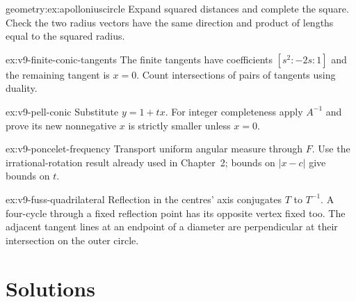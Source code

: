 \begin{hint}{geometry:ex:apolloniuscircle}
Expand squared distances and complete the square. Check the two radius vectors have the same direction and product of lengths equal to the squared radius.
\end{hint}
\begin{hint}{ex:v9-finite-conic-tangents}
The finite tangents have coefficients $[s^2:-2s:1]$ and the remaining tangent is $x=0$. Count intersections of pairs of tangents using duality.
\end{hint}
\begin{hint}{ex:v9-pell-conic}
Substitute $y=1+tx$. For integer completeness apply $A^{-1}$ and prove its new nonnegative $x$ is strictly smaller unless $x=0$.
\end{hint}
\begin{hint}{ex:v9-poncelet-frequency}
Transport uniform angular measure through $F$. Use the irrational-rotation result already used in Chapter~2; bounds on $|x-c|$ give bounds on $t$.
\end{hint}
\begin{hint}{ex:v9-fuss-quadrilateral}
Reflection in the centres' axis conjugates $T$ to $T^{-1}$. A four-cycle through a fixed reflection point has its opposite vertex fixed too. The adjacent tangent lines at an endpoint of a diameter are perpendicular at their intersection on the outer circle.
\end{hint}

\section{Solutions}

